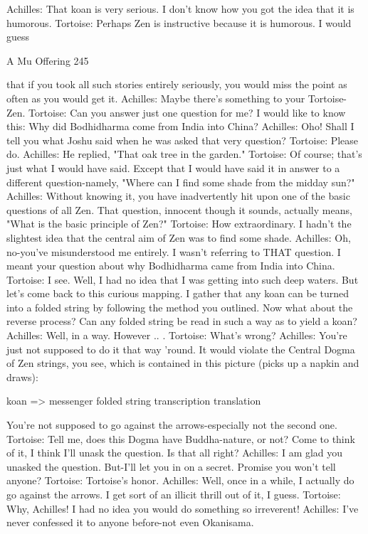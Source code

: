 Achilles: That koan is very serious. I don't know how you got the idea that it is
   humorous.
Tortoise: Perhaps Zen is instructive because it is humorous. I would guess




A Mu Offering                                                                         245

   that if you took all such stories entirely seriously, you would miss the point as often as
   you would get it.
Achilles: Maybe there's something to your Tortoise-Zen.
Tortoise: Can you answer just one question for me? I would like to know this: Why did
   Bodhidharma come from India into China?
Achilles: Oho! Shall I tell you what Joshu said when he was asked that very question?
Tortoise: Please do.
Achilles: He replied, "That oak tree in the garden."
Tortoise: Of course; that's just what I would have said. Except that I would have said it in
   answer to a different question-namely, "Where can I find some shade from the
   midday sun?"
Achilles: Without knowing it, you have inadvertently hit upon one of the basic questions
   of all Zen. That question, innocent though it sounds, actually means, "What is the
   basic principle of Zen?"
Tortoise: How extraordinary. I hadn't the slightest idea that the central aim of Zen was to
   find some shade.
Achilles: Oh, no-you've misunderstood me entirely. I wasn't referring to THAT question.
   I meant your question about why Bodhidharma came from India into China.
Tortoise: I see. Well, I had no idea that I was getting into such deep waters. But let's
   come back to this curious mapping. I gather that any koan can be turned into a folded
   string by following the method you outlined. Now what about the reverse process?
   Can any folded string be read in such a way as to yield a koan?
Achilles: Well, in a way. However .. .
Tortoise: What's wrong?
Achilles: You're just not supposed to do it that way 'round. It would violate the Central
   Dogma of Zen strings, you see, which is contained in this picture (picks up a napkin
   and draws):

                        koan    =>      messenger     folded string
                                 transcription translation

   You're not supposed to go against the arrows-especially not the second one.
Tortoise: Tell me, does this Dogma have Buddha-nature, or not? Come to think of it, I
   think I'll unask the question. Is that all right?
Achilles: I am glad you unasked the question. But-I'll let you in on a secret. Promise you
   won't tell anyone?
Tortoise: Tortoise's honor.
Achilles: Well, once in a while, I actually do go against the arrows. I get sort of an illicit
   thrill out of it, I guess.
Tortoise: Why, Achilles! I had no idea you would do something so irreverent!
Achilles: I've never confessed it to anyone before-not even Okanisama.




